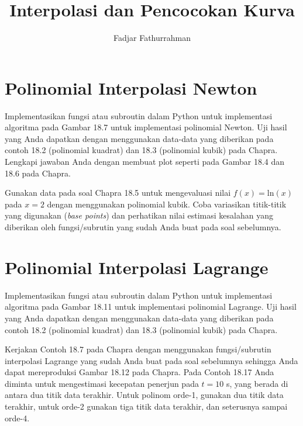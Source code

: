 



\title{Interpolasi dan Pencocokan Kurva}
\author{Fadjar Fathurrahman}
\date{}
\maketitle

\section{Polinomial Interpolasi Newton}

\begin{soal}
Implementasikan fungsi atau subroutin dalam Python untuk implementasi algoritma
pada Gambar 18.7 untuk implementasi polinomial Newton.
Uji hasil yang Anda dapatkan dengan menggunakan data-data yang diberikan pada contoh
18.2 (polinomial kuadrat) dan 18.3 (polinomial kubik) pada Chapra.
Lengkapi jawaban Anda dengan membuat plot seperti pada Gambar 18.4 dan 18.6 pada Chapra.
\end{soal}

\begin{soal}
Gunakan data pada soal Chapra 18.5 untuk mengevaluasi nilai $f(x) = \mathrm{ln}(x)$
pada $x = 2$ dengan menggunakan polinomial kubik. Coba variasikan titik-titik
yang digunakan (\textit{base points}) dan perhatikan nilai estimasi
kesalahan yang diberikan oleh
fungsi/subrutin yang sudah Anda buat pada soal sebelumnya.
\end{soal}

\section{Polinomial Interpolasi Lagrange}
\begin{soal}
Implementasikan fungsi atau subroutin dalam Python untuk implementasi algoritma
pada Gambar 18.11 untuk implementasi polinomial Lagrange.
Uji hasil yang Anda dapatkan dengan menggunakan data-data yang diberikan pada contoh
18.2 (polinomial kuadrat) dan 18.3 (polinomial kubik) pada Chapra.
\end{soal}

\begin{soal}
Kerjakan Contoh 18.7 pada Chapra dengan menggunakan fungsi/subrutin interpolasi Lagrange
yang sudah Anda buat pada soal sebelumnya sehingga Anda dapat mereproduksi Gambar 18.12
pada Chapra. Pada Contoh 18.17 Anda diminta untuk mengestimasi kecepatan penerjun
pada $t=10$ s, yang berada di antara dua titik data terakhir.
Untuk polinom orde-1, gunakan dua titik data terakhir, untuk orde-2 gunakan tiga titik
data terakhir, dan seterusnya sampai orde-4.
\end{soal}

